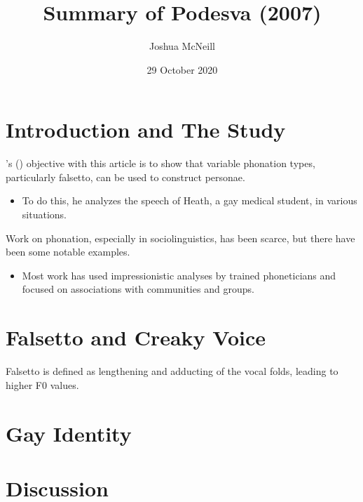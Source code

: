 \documentclass{article}
\title{Summary of Podesva (2007)}
\author{Joshua McNeill}
\date{29 October 2020}
\begin{document}
  \maketitle
  \section{Introduction and The Study}
    \noindent{}\citeauthor{podesva_phonation_2007}'s (\citeyear{podesva_phonation_2007}) objective with this article is to show that variable phonation types, particularly falsetto, can be used to construct personae.
    \begin{itemize}
      \item To do this, he analyzes the speech of Heath, a gay medical student, in various situations.
    \end{itemize}
    Work on phonation, especially in sociolinguistics, has been scarce, but there have been some notable examples.
    \begin{itemize}
      \item Most work has used impressionistic analyses by trained phoneticians and focused on associations with communities and groups.
    \end{itemize}
  \section{Falsetto and Creaky Voice}
    Falsetto is defined as lengthening and adducting of the vocal folds, leading to higher F0 values.
  \section{Gay Identity}
  \section{Discussion}
\end{document}
